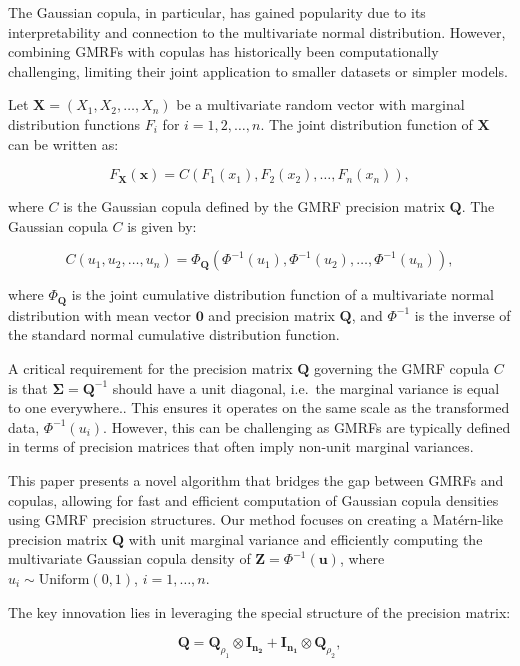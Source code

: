 \documentclass[
  letterpaper,
  DIV=11,
  numbers=noendperiod]{scrartcl}
\begin{document}
The Gaussian copula, in particular, has gained popularity due to its
interpretability and connection to the multivariate normal distribution.
However, combining GMRFs with copulas has historically been
computationally challenging, limiting their joint application to smaller
datasets or simpler models.

Let \(\mathbf{X} = (X_1, X_2, \ldots, X_n)\) be a multivariate random
vector with marginal distribution functions \(F_i\) for
\(i = 1, 2, \ldots, n\). The joint distribution function of
\(\mathbf{X}\) can be written as:

\[
F_{\mathbf{X}}(\mathbf{x}) = C(F_1(x_1), F_2(x_2), \ldots, F_n(x_n)),
\]

where \(C\) is the Gaussian copula defined by the GMRF precision matrix
\(\mathbf{Q}\). The Gaussian copula \(C\) is given by:

\[
C(u_1, u_2, \ldots, u_n) = \Phi_\mathbf{Q}(\Phi^{-1}(u_1), \Phi^{-1}(u_2), \ldots, \Phi^{-1}(u_n)),
\]

where \(\Phi_\mathbf{Q}\) is the joint cumulative distribution function
of a multivariate normal distribution with mean vector \(\mathbf{0}\)
and precision matrix \(\mathbf{Q}\), and \(\Phi^{-1}\) is the inverse of
the standard normal cumulative distribution function.

A critical requirement for the precision matrix \(\mathbf{Q}\) governing
the GMRF copula \(C\) is that \(\mathbf{\Sigma} = \mathbf{Q}^{-1}\)
should have a unit diagonal, i.e.~the marginal variance is equal to one
everywhere.. This ensures it operates on the same scale as the
transformed data, \(\Phi^{-1}(u_i)\). However, this can be challenging
as GMRFs are typically defined in terms of precision matrices that often
imply non-unit marginal variances.

This paper presents a novel algorithm that bridges the gap between GMRFs
and copulas, allowing for fast and efficient computation of Gaussian
copula densities using GMRF precision structures. Our method focuses on
creating a Matérn-like precision matrix \(\mathbf{Q}\) with unit
marginal variance and efficiently computing the multivariate Gaussian
copula density of \(\mathbf{Z} = \Phi^{-1}(\mathbf{u})\), where
\(u_i \sim \text{Uniform}(0, 1)\), \(i = 1, \dots, n\).

The key innovation lies in leveraging the special structure of the
precision matrix:

\[
\mathbf{Q} = \mathbf{Q}_{\rho_1} \otimes \mathbf{I_{n_2}} + \mathbf{I_{n_1}} \otimes \mathbf{Q}_{\rho_2},
\]
\end{document}
